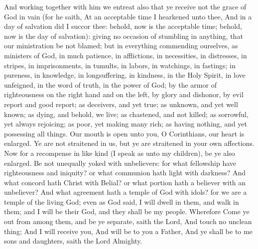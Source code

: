 And working together with him we entreat also that ye receive not the grace of God in vain (for he saith, At an acceptable time I hearkened unto thee, And in a day of salvation did I succor thee: behold, now is the acceptable time; behold, now is the day of salvation): giving no occasion of stumbling in anything, that our ministration be not blamed; but in everything commending ourselves, as ministers of God, in much patience, in afflictions, in necessities, in distresses, in stripes, in imprisonments, in tumults, in labors, in watchings, in fastings; in pureness, in knowledge, in longsuffering, in kindness, in the Holy Spirit, in love unfeigned, in the word of truth, in the power of God; by the armor of righteousness on the right hand and on the left, by glory and dishonor, by evil report and good report; as deceivers, and yet true; as unknown, and yet well known; as dying, and behold, we live; as chastened, and not killed; as sorrowful, yet always rejoicing; as poor, yet making many rich; as having nothing, and yet possessing all things.  Our mouth is open unto you, O Corinthians, our heart is enlarged. Ye are not straitened in us, but ye are straitened in your own affections. Now for a recompense in like kind (I speak as unto my children), be ye also enlarged.  Be not unequally yoked with unbelievers: for what fellowship have righteousness and iniquity? or what communion hath light with darkness? And what concord hath Christ with Belial? or what portion hath a believer with an unbeliever? And what agreement hath a temple of God with idols? for we are a temple of the living God; even as God said, I will dwell in them, and walk in them; and I will be their God, and they shall be my people. Wherefore Come ye out from among them, and be ye separate, saith the Lord, And touch no unclean thing; And I will receive you,  And will be to you a Father, And ye shall be to me sons and daughters, saith the Lord Almighty. 

